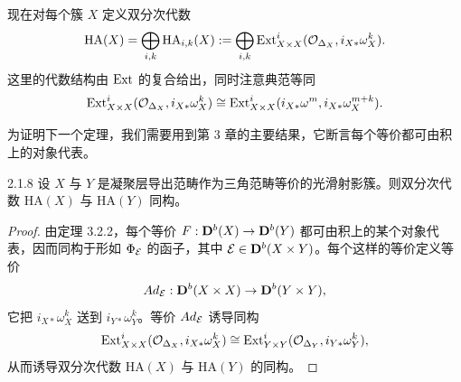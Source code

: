 
现在对每个簇 $X$ 定义双分次代数
\begin{equation*}
\mathrm{HA}(X)=\bigoplus_{i,k}\mathrm{HA}_{i,k}(X):=\bigoplus_{i,k}\operatorname{Ext}^{i}_{X\times X}(\mathcal{O}_{\Delta_X},i_{X*}\omega^{k}_{X}).
\end{equation*}
这里的代数结构由 $\operatorname{Ext}$ 的复合给出，同时注意典范等同
\begin{equation*}
\operatorname{Ext}^{i}_{X\times X}(\mathcal{O}_{\Delta_X},i_{X*}\omega^{k}_{X})\cong\operatorname{Ext}^{i}_{X\times X}(i_{X*}\omega^{m},i_{X*}\omega^{m+k}_{X}).
\end{equation*}


为证明下一个定理，我们需要用到第 3 章的主要结果，它断言每个等价都可由积上的对象代表。

\begin{theorem}{2.1.8}
设 $X$ 与 $Y$ 是凝聚层导出范畴作为三角范畴等价的光滑射影簇。则双分次代数 $\mathrm{HA}(X)$ 与 $\mathrm{HA}(Y)$ 同构。
\end{theorem}

\begin{proof}
由定理 3.2.2，每个等价 $F:\mathbf{D}^{b}(X)\to\mathbf{D}^{b}(Y)$ 都可由积上的某个对象代表，因而同构于形如 $\Phi_{\mathcal{E}}$ 的函子，其中 $\mathcal{E}\in\mathbf{D}^{b}(X\times Y)$。每个这样的等价定义等价
\begin{equation*}
Ad_{\mathcal{E}}:\mathbf{D}^{b}(X\times X)\to\mathbf{D}^{b}(Y\times Y),
\end{equation*}
它把 $i_{X*}\omega^{k}_{X}$ 送到 $i_{Y*}\omega^{k}_{Y}$。等价 $Ad_{\mathcal{E}}$ 诱导同构
\begin{equation*}
\operatorname{Ext}^{i}_{X\times X}(\mathcal{O}_{\Delta_X},i_{X*}\omega^{k}_{X})\cong\operatorname{Ext}^{i}_{Y\times Y}(\mathcal{O}_{\Delta_Y},i_{Y*}\omega^{k}_{Y}),
\end{equation*}
从而诱导双分次代数 $\mathrm{HA}(X)$ 与 $\mathrm{HA}(Y)$ 的同构。
\end{proof}

